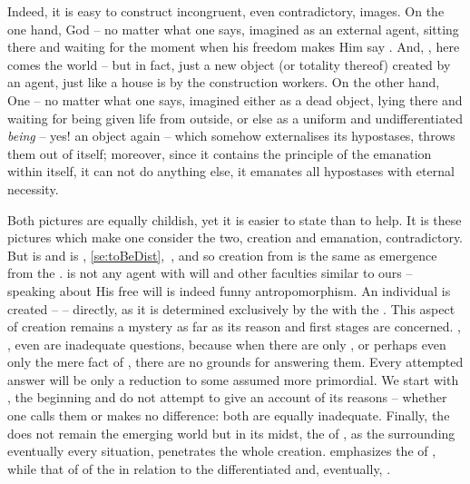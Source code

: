 Indeed, it is easy to construct incongruent, even contradictory, images.  On the
one hand, God -- no matter what one says, imagined as an external agent, sitting
there and waiting for the moment when his freedom makes Him say .
And, , here comes the world -- but in fact, just a new object (or
totality thereof) created by an agent, just like a house is  by the
construction workers.  On the other hand, One -- no matter what one says,
imagined either as a dead object, lying there and waiting for being given life
from outside, or else as a uniform and undifferentiated {\em being} -- yes! an
object again -- which somehow externalises its hypostases, throws them out of
itself; moreover, since it contains the principle of the emanation within
itself, it can not do anything else, it emanates all hypostases with eternal
necessity.

Both pictures are equally childish, yet it is easier to state than to help. It
is these pictures which make one 
consider the two, creation and emanation, contradictory. But  is
 and  is , \ref{se:toBeDist},~, and so
creation from  is the same as emergence from the
.  is not any 
agent with will and other faculties similar to ours -- speaking about His free
will is indeed funny antropomorphism. An individual  is created --
 -- directly, as it is determined exclusively by the
 with the . This aspect of creation remains a mystery
as far as its reason and first stages are concerned. , ,
even  are inadequate questions, because when there are only , or perhaps even only the mere fact of , there
are no grounds for answering them. Every attempted answer will be only
 a reduction to some  assumed more primordial. We start with
, the  beginning 
and do not attempt to give an account of its reasons -- whether one calls them
 or  makes no difference: both
are equally inadequate.  Finally, the  does not remain  the
emerging world but in its midst, the  of , as the
 surrounding eventually every situation, penetrates the
whole creation. 
 emphasizes the  of , while 
that of  of the  in relation to the differentiated
and, eventually, .


